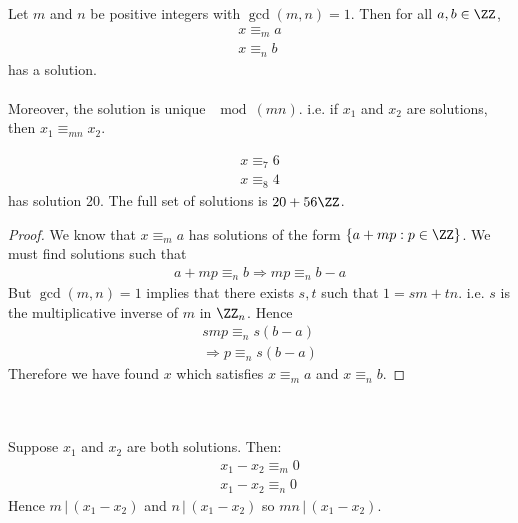 \documentclass[class=scrartcl, crop=false]{standalone}
\begin{document}
\begin{lemma}[16.41]
  Let $m$ and $n$ be positive integers with $\gcd(m, n) = 1$. Then for all $a, b \in \ZZ$,
  \begin{gather*}
    x \equiv_m a \\
    x \equiv_n b
  \end{gather*} has a solution.
  \\\\
  Moreover, the solution is unique $\mod (mn)$. i.e. if $x_1$ and $x_2$ are solutions, then $x_{1} \equiv_{mn} x_2$.
  \begin{example}
    \begin{gather*}
      x \equiv_7 6 \\
      x \equiv_8 4
    \end{gather*} has solution 20. The full set of solutions is $20 + 56 \ZZ$.
  \end{example} 
  \begin{proof}
    We know that $x \equiv_m a$ has solutions of the form $\{a + mp: p \in \ZZ\}$. We must find solutions such that 
    \begin{gather*}
      a + mp \equiv_n b \Rightarrow mp \equiv_n b - a
    \end{gather*} 
    But $\gcd(m, n) = 1$ implies that there exists $s, t$ such that $1 = sm + tn$. i.e. $s$ is the multiplicative inverse of $m$ in $\ZZ_n$. Hence 
    \begin{gather*}
      smp \equiv_n s(b - a) \\
      \Rightarrow p \equiv_n s(b - a)
    \end{gather*} 
    Therefore we have found $x$ which satisfies $x \equiv_m a$ and $x \equiv_n b$.
  \end{proof} \leavevmode \\\\
  Suppose $x_1$ and $x_2$ are both solutions. Then: 
  \begin{gather*}
    x_1 - x_2 \equiv_m 0 \\
    x_1 - x_2 \equiv_n 0
  \end{gather*} 
  Hence $m \, | \, (x_1 - x_2)$ and $n \, | \, (x_1 - x_2)$ so $mn \, | \, (x_1 - x_2)$.
\end{lemma} 
\end{document}
